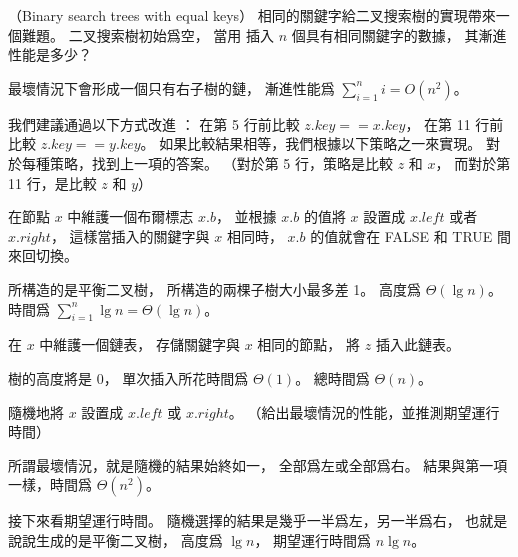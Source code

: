 \startPROBLEM
（Binary search trees with equal keys）
相同的關鍵字給二叉搜索樹的實現帶來一個難題。
\startigBase[a]\startitem
二叉搜索樹初始爲空，
當用  插入 $n$ 個具有相同關鍵字的數據，
其漸進性能是多少？
\stopitem\stopigBase

\startANSWER
最壞情況下會形成一個只有右子樹的鏈，
漸進性能爲 $\sum_{i=1}^{n}i = O(n^2)$。
\stopANSWER

我們建議通過以下方式改進 ：
在第 5 行前比較 $z.key == x.key$，
在第 11 行前比較 $z.key == y.key$。
如果比較結果相等，我們根據以下策略之一來實現。
對於每種策略，找到上一項的答案。
（對於第 5 行，策略是比較 $z$ 和 $x$，
而對於第 11 行，是比較 $z$ 和 $y$）

\startigBase[continue]\startitem
在節點 $x$ 中維護一個布爾標志 $x.b$，
並根據 $x.b$ 的值將 $x$ 設置成 $x.left$ 或者 $x.right$，
這樣當插入的關鍵字與 $x$ 相同時，
 $x.b$ 的值就會在 FALSE 和 TRUE 間來回切換。
\stopitem\stopigBase

\startANSWER
所構造的是平衡二叉樹，
所構造的兩棵子樹大小最多差 1。
高度爲 $\Theta(\lg{n})$。
時間爲 $\sum_{i=1}^{n}\lg{n} = \Theta(\lg{n})$。
\stopANSWER

\startigBase[continue]\startitem
在 $x$ 中維護一個鏈表，
存儲關鍵字與 $x$ 相同的節點，
將 $z$ 插入此鏈表。
\stopitem\stopigBase

\startANSWER
樹的高度將是 0，
單次插入所花時間爲 $\Theta(1)$。
總時間爲 $\Theta(n)$。
\stopANSWER

\startigBase[continue]\startitem
隨機地將 $x$ 設置成 $x.left$ 或 $x.right$。
（給出最壞情況的性能，並推測期望運行時間）
\stopitem\stopigBase

\startANSWER
所謂最壞情況，就是隨機的結果始終如一，
全部爲左或全部爲右。
結果與第一項一樣，時間爲 $\Theta(n^2)$。

接下來看期望運行時間。
隨機選擇的結果是幾乎一半爲左，另一半爲右，
也就是說說生成的是平衡二叉樹，
高度爲 $\lg n$，
期望運行時間爲 $n\lg n$。
\stopANSWER

\stopPROBLEM
